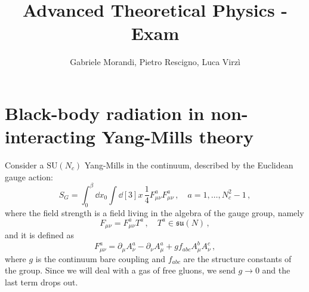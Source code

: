 \documentclass{article}
\title{Advanced Theoretical Physics - Exam}
\author{Gabriele Morandi, Pietro Rescigno, Luca Virzì}
\begin{document}
\maketitle





\section{Black-body radiation in non-interacting Yang-Mills theory}

Consider a $\mathrm{SU}(N_c)$  Yang-Mills in the continuum, described by the Euclidean gauge action:
\begin{equation}\label{eq: action}
    S_G = \int_0^\beta \dd{x_0} \int \dd[3]{x} \, \frac{1}{4} F_{\mu\nu}^a F_{\mu\nu}^a \, , \quad a = 1, \dots, N_c^2 - 1 \, ,
\end{equation}
where the field strength is a field living in the algebra of the gauge group, namely
\begin{equation}\label{eq: f}
    F_{\mu\nu} = F_{\mu\nu}^a T^a \, , \quad T^a \in \mathfrak{su}(N) \, ,
\end{equation}
and it is defined as
\begin{equation}
    F_{\mu\nu}^a = \partial_\mu A_\nu^a - \partial_\nu A_\mu^a + g f_{abc} A_\mu^b A_\nu^c \, , 
\end{equation}
where $g$ is the continuum bare coupling and $f_{abc}$ are the structure constants of the group.
Since we will deal with a gas of free gluons, we send $g \to 0$ and the last term drops out.
\end{document}
